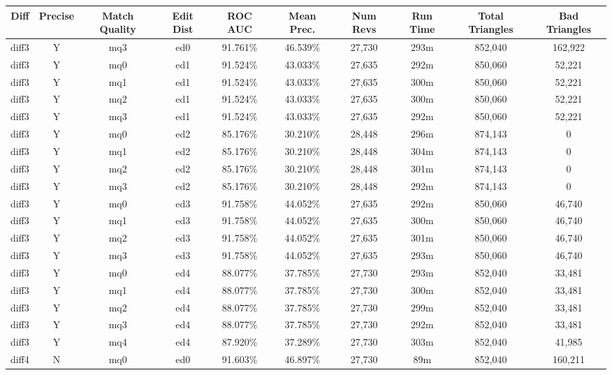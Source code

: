 \begin{sidewaystable}[!tp]
  \begin{center}
    \begin{tabular}{|c|c|c|c||c|c||c|c|c|c|}
\hline
Diff & Precise & Match Quality & Edit Dist
        & ROC AUC & Mean Prec.
        & Num Revs & Run Time
        & Total Triangles & Bad Triangles \\
\hline
\hline
diff3 & Y & mq3 & ed0 & 91.761\% & 46.539\% & 27,730 & 293m & 852,040 & 162,922 \\
diff3 & Y & mq0 & ed1 & 91.524\% & 43.033\% & 27,635 & 292m & 850,060 & 52,221 \\
diff3 & Y & mq1 & ed1 & 91.524\% & 43.033\% & 27,635 & 300m & 850,060 & 52,221 \\
diff3 & Y & mq2 & ed1 & 91.524\% & 43.033\% & 27,635 & 300m & 850,060 & 52,221 \\
diff3 & Y & mq3 & ed1 & 91.524\% & 43.033\% & 27,635 & 292m & 850,060 & 52,221 \\
diff3 & Y & mq0 & ed2 & 85.176\% & 30.210\% & 28,448 & 296m & 874,143 & 0 \\
diff3 & Y & mq1 & ed2 & 85.176\% & 30.210\% & 28,448 & 304m & 874,143 & 0 \\
diff3 & Y & mq2 & ed2 & 85.176\% & 30.210\% & 28,448 & 301m & 874,143 & 0 \\
diff3 & Y & mq3 & ed2 & 85.176\% & 30.210\% & 28,448 & 292m & 874,143 & 0 \\
diff3 & Y & mq0 & ed3 & 91.758\% & 44.052\% & 27,635 & 292m & 850,060 & 46,740 \\
diff3 & Y & mq1 & ed3 & 91.758\% & 44.052\% & 27,635 & 300m & 850,060 & 46,740 \\
diff3 & Y & mq2 & ed3 & 91.758\% & 44.052\% & 27,635 & 301m & 850,060 & 46,740 \\
diff3 & Y & mq3 & ed3 & 91.758\% & 44.052\% & 27,635 & 293m & 850,060 & 46,740 \\
diff3 & Y & mq0 & ed4 & 88.077\% & 37.785\% & 27,730 & 293m & 852,040 & 33,481 \\
diff3 & Y & mq1 & ed4 & 88.077\% & 37.785\% & 27,730 & 300m & 852,040 & 33,481 \\
diff3 & Y & mq2 & ed4 & 88.077\% & 37.785\% & 27,730 & 299m & 852,040 & 33,481 \\
diff3 & Y & mq3 & ed4 & 88.077\% & 37.785\% & 27,730 & 292m & 852,040 & 33,481 \\
diff3 & Y & mq4 & ed4 & 87.920\% & 37.289\% & 27,730 & 303m & 852,040 & 41,985 \\
diff4 & N & mq0 & ed0 & 91.603\% & 46.897\% & 27,730 & 89m & 852,040 & 160,211 \\

\end{tabular}
\end{center}
\end{sidewaystable}
